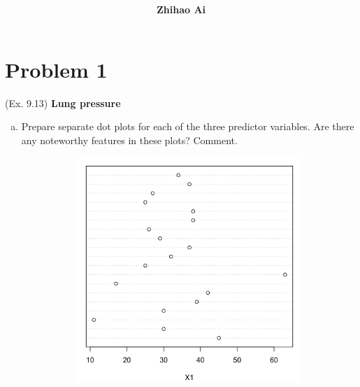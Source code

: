 \documentclass[10pt]{report}
\title{
	\vspace{2in}
	\textmd{\textbf{\hwCourse\\\hwTitle}}\\
	\vspace{0.3in}\large{\textit{\hmClassInstructor}}
	\vspace{3in}
}
\author{\textbf{Zhihao Ai}}
\date{}
\begin{document}
\maketitle

\section*{Problem 1}
(Ex. 9.13) \textbf{Lung pressure}
\begin{enumerate}[a.]
	\item 
	Prepare separate dot plots for each of the three predictor variables. Are there any noteworthy features in these plots? Comment.
	\begin{figure}[H]
		\centering
		\begin{subfigure}[b]{.3\linewidth}
			\includegraphics[width=\linewidth]{p1/13a_x1.png}
		\end{subfigure}
		\begin{subfigure}[b]{.3\linewidth}

\end{subfigure}
\end{figure}
\end{enumerate}
\end{document}
